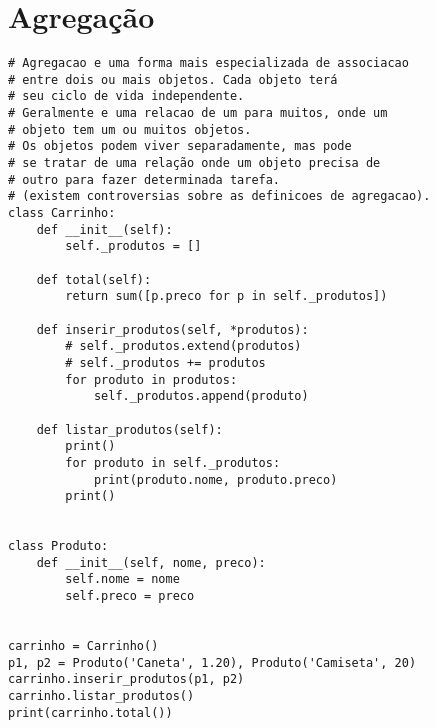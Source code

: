 \documentclass{article}
\begin{document}
\section{Agregação}
\begin{lstlisting}
# Agregacao e uma forma mais especializada de associacao
# entre dois ou mais objetos. Cada objeto terá
# seu ciclo de vida independente.
# Geralmente e uma relacao de um para muitos, onde um
# objeto tem um ou muitos objetos.
# Os objetos podem viver separadamente, mas pode
# se tratar de uma relação onde um objeto precisa de
# outro para fazer determinada tarefa.
# (existem controversias sobre as definicoes de agregacao).
class Carrinho:
    def __init__(self):
        self._produtos = []

    def total(self):
        return sum([p.preco for p in self._produtos])

    def inserir_produtos(self, *produtos):
        # self._produtos.extend(produtos)
        # self._produtos += produtos
        for produto in produtos:
            self._produtos.append(produto)

    def listar_produtos(self):
        print()
        for produto in self._produtos:
            print(produto.nome, produto.preco)
        print()


class Produto:
    def __init__(self, nome, preco):
        self.nome = nome
        self.preco = preco


carrinho = Carrinho()
p1, p2 = Produto('Caneta', 1.20), Produto('Camiseta', 20)
carrinho.inserir_produtos(p1, p2)
carrinho.listar_produtos()
print(carrinho.total())
    
\end{lstlisting}
\end{document}
